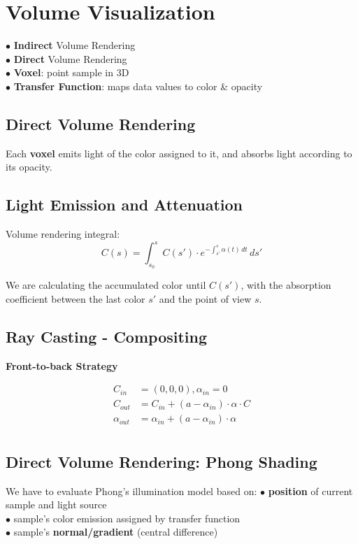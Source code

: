 
\section{Volume Visualization}
$\bullet$ \textbf{Indirect} Volume Rendering \\
$\bullet$ \textbf{Direct} Volume Rendering \\
$\bullet$ \textbf{Voxel}: point sample in 3D \\
$\bullet$ \textbf{Transfer Function}: maps data values to color \& opacity

\begin{center}
\end{center}

\subsection{Direct Volume Rendering}
Each \textbf{voxel} emits light of the color assigned to it, and absorbs light according to its opacity.

\subsection{Light Emission and Attenuation}
Volume rendering integral:
$$C(s) = \int_{s_0}^{s} C(s') \cdot e^{-\int_{s'}^s \alpha(t) \,dt} \,ds'$$

We are calculating the accumulated color until $C(s')$, with the absorption coefficient between the last color $s'$ and the point of view $s$.

\subsection{Ray Casting - Compositing}
\textbf{Front-to-back Strategy}

\begin{align*}
    C_{in} &= (0,0,0), \alpha_{in} = 0                         \\
    C_{out} &= C_{in} + (a - \alpha_{in}) \cdot \alpha \cdot C \\
    \alpha_{out} &= \alpha_{in} + (a - \alpha_{in}) \cdot \alpha    \\
\end{align*}

\subsection{Direct Volume Rendering: Phong Shading}
We have to evaluate Phong's illumination model based on:
$\bullet$ \textbf{position} of current sample and light source \\
$\bullet$ sample's \textnormal{color} emission assigned by transfer function \\
$\bullet$ sample's \textbf{normal/gradient} (central difference)

